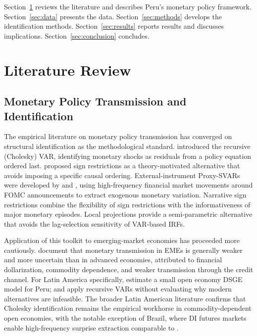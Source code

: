 \documentclass[12pt,letterpaper]{article}
\begin{document}
Section~\ref{sec:litreview} reviews the literature and describes Peru's
monetary policy framework. Section~\ref{sec:data} presents the data.
Section~\ref{sec:methods} develops the identification methods.
Section~\ref{sec:results} reports results and discusses implications.
Section~\ref{sec:conclusion} concludes.

\section{Literature Review}
\label{sec:litreview}

\subsection{Monetary Policy Transmission and Identification}
\label{sec:litreview_methods}

The empirical literature on monetary policy transmission has converged on
structural identification as the methodological standard. \citet{sims1980}
introduced the recursive (Cholesky) VAR, identifying monetary shocks as
residuals from a policy equation ordered last. \citet{uhlig2005} proposed
sign restrictions as a theory-motivated alternative that avoids imposing
a specific causal ordering. External-instrument Proxy-SVARs were developed
by \citet{stock2018} and \citet{gertler2015}, using high-frequency financial
market movements around FOMC announcements to extract exogenous monetary
variation. Narrative sign restrictions \citep{antolin2018} combine the
flexibility of sign restrictions with the informativeness of major monetary
episodes. Local projections \citep{jorda2005} provide a semi-parametric
alternative that avoids the lag-selection sensitivity of VAR-based IRFs.

Application of this toolkit to emerging-market economies has proceeded more
cautiously. \citet{ha2025} document that monetary transmission in EMEs is
generally weaker and more uncertain than in advanced economies, attributed
to financial dollarization, commodity dependence, and weaker transmission
through the credit channel. For Latin America specifically, \citet{castillo2011}
estimate a small open economy DSGE model for Peru; \citet{portilla2022} and
\citet{perezrojo2024} apply recursive VARs without evaluating why modern
alternatives are infeasible. The broader Latin American literature confirms
that Cholesky identification remains the empirical workhorse in
commodity-dependent open economies, with the notable exception of Brazil,
where DI futures markets enable high-frequency surprise extraction
comparable to \citet{gertler2015}.
\end{document}
